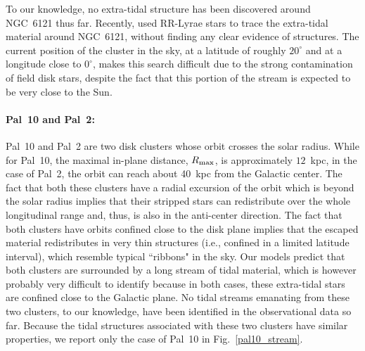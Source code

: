             To our knowledge, no extra-tidal structure has been discovered  around NGC~6121 thus far. Recently, \citet{2019MNRAS.483.1737K} used RR-Lyrae stars to trace the extra-tidal material around NGC~6121, without finding any clear evidence of structures. The current position of the cluster in the sky, at a latitude of roughly $20^\circ$ and at a longitude close to $0^\circ$, makes this search  difficult due to the strong contamination of field disk stars, despite the fact that this portion of the stream is expected to be very close to the Sun.

            \paragraph{Pal~10 and Pal~2: }

            Pal~10 and Pal~2 are two disk clusters whose orbit crosses the solar radius. While for Pal~10, the maximal in-plane distance, $R_{\rm max}$, is approximately $12$~kpc, in the case of Pal~2, the orbit can reach about 40~kpc from the Galactic center. The fact that both these clusters have a radial excursion of the orbit which is beyond the solar radius implies that their stripped stars can redistribute over the whole longitudinal range and, thus, is also in the anti-center direction. The fact that both clusters have orbits confined close to the disk plane implies that the escaped material redistributes in very thin structures (i.e., confined in a limited latitude interval), which resemble typical ``ribbons" in the sky.  Our models predict that both clusters are surrounded by a long stream of tidal material, which is however probably very difficult to identify because in both cases, these extra-tidal stars are confined close to the Galactic plane. No tidal streams emanating from these two clusters, to our knowledge, have been identified in the observational data so far.  Because the tidal structures associated with these two clusters have similar properties, we report only the case of Pal~10 in Fig.~\ref{pal10_stream}. 
            \twocolumn
